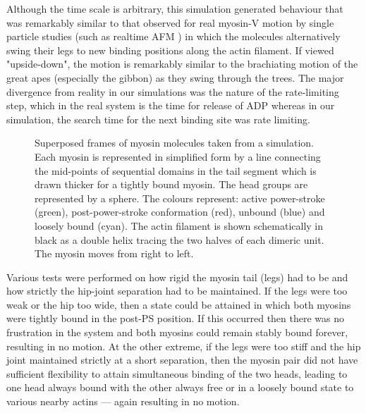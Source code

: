 Although the time scale is arbitrary, this simulation generated
behaviour that was remarkably similar to that observed for real myosin-V
motion by single particle studies (such as realtime AFM \cite{KoderaNet10})
in which the molecules alternatively swing their legs to new binding positions along
the actin filament.   If viewed "upside-down", the motion is remarkably similar
to the brachiating motion of the great apes (especially the gibbon) as they
swing through the trees.  The major divergence from reality in our simulations was
the nature of the rate-limiting step, which in the
real system is the time for release of ADP whereas in our simulation, the
search time for the next binding site was rate limiting.

\begin{figure}
\centering
{}
\caption{
\label{Fig:search}
Superposed frames of myosin molecules taken from a simulation.   Each myosin is represented 
in simplified form by a line connecting the mid-points of sequential domains in the tail segment
which is drawn thicker for a tightly bound myosin.  The head groups are represented by a sphere.
The colours represent: active power-stroke (green), post-power-stroke conformation (red), unbound
(blue) and loosely bound (cyan).   The actin filament is shown schematically in black as a 
double helix tracing the two halves of each dimeric unit.  The myosin moves from right to left.
}
\end{figure}
                                                         
Various tests were performed on how rigid the myosin tail (legs) had
to be and how strictly the hip-joint separation had to be maintained.
If the legs were too weak or the hip too wide, then a state could be
attained in which both myosins were tightly bound in the post-PS position.
If this occurred then there was no frustration in the system and both
myosins could remain stably bound forever, resulting in no motion.
At the other extreme, if the legs were too stiff and the hip joint
maintained strictly at a short separation, then the myosin pair did
not have sufficient flexibility to attain simultaneous binding of the
two heads, leading to one head always bound with the other always 
free or in a loosely bound state to various nearby actins --- again
resulting in no motion.
